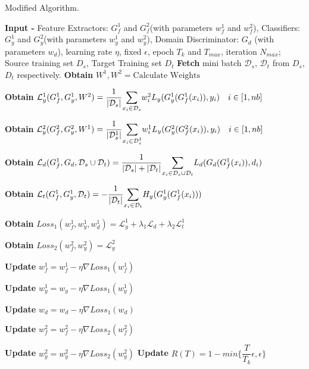 \begin{algorithm}[H]
	\caption{Modified Algorithm.} 
	\begin{algorithmic}[1]
	    \State \textbf{Input -} Feature Extractors: $G_{f}^1$ and $G_{f}^2$(with parameters $w_{f}^1$ and $w_{f}^2$), Classifiers: $G_{y}^1$ and $G_{y}^2$(with parameters $w_{y}^1$ and $w_{y}^2$), Domain Discriminator: $G_d$ (with parameters $w_d$), learning rate $\eta$, fixed $\epsilon$, epoch $T_k$ and $T_{max}$, iteration $N_{max}$;
		    \State Source training set ${D_s}$, Target Training set ${D_t}$
				    \State \textbf{Fetch} mini batch $\mathcal{D}_s$, $\mathcal{D}_t$ from ${D_s}$, ${D_t}$ respectively.
				    \State \textbf{Obtain} $W^1, W^2 = \text{Calculate Weights}$ 
				    
				    \State \textbf{Obtain} $\mathcal{L}_{y}^1(G_{f}^1, G_{y}^1,W^2) =\dfrac{1}{|\mathcal{D}_{s}|} \mathlarger\sum\limits_{x_i \in \mathcal{D}_{s}} w_{i}^2 L_y(G_{y}^1(G_{f}^1(x_i)),y_i) \quad i \in [1, nb]$
				    
                    \State \textbf{Obtain} $\mathcal{L}_{y}^2(G_{f}^2, G_{y}^2, W^1) =\dfrac{1}{|\mathcal{D}_{s}^1|} \mathlarger\sum\limits_{x_i \in \mathcal{D}_{s}^1} w_{i}^1 L_y(G_{y}^2(G_{f}^2(x_i)),y_i) \quad i \in [1, nb]$
				    
				    \State \textbf{Obtain} $\mathcal{L}_d(G_{f}^1, G_{d}, \mathcal{D}_s \cup \mathcal{D}_t) = \dfrac{1}{|\mathcal{D}_s| + |\mathcal{D}_t|} \mathlarger\sum\limits_{x_i \in \mathcal{D}_s \cup \mathcal{D}_t} L_d(G_d(G_{f}^1(x_i)), d_i)$
				    
				    \State \textbf{Obtain} $\mathcal{L}_t(G_{f}^1, G_{y}^1, \mathcal{D}_t) = - \dfrac{1}{|\mathcal{D}_t|} \mathlarger\sum\limits_{x_i \in \mathcal{D}_t} H_y(G_{y}^1(G_{f}^1(x_i)))$ 
				    
				    \State \textbf{Obtain} $Loss_1(w_{f}^1, w_{y}^1, w_{d}^1) = \mathcal{L}_{y}^1 + \lambda_1 \mathcal{L}_{d} + \lambda_2\mathcal{L}_{t}^1$
				    
				    \State \textbf{Obtain} $Loss_2(w_{f}^2, w_{y}^2) = \mathcal{L}_{y}^2$
				    
				    \State \textbf{Update} $w_{f}^1 = w_{f}^1 - \eta\nabla Loss_1(w_{f}^1)$
				    
				    \State \textbf{Update} $w_{y}^1 = w_{y} - \eta\nabla Loss_1(w_{y}^1)$
				    
				    \State \textbf{Update} $w_{d} = w_{d} - \eta\nabla Loss_1(w_{d})$
				    
				    \State \textbf{Update} $w_{f}^2 = w_{f}^2 - \eta\nabla Loss_2(w_{f}^2)$
				    
				    \State \textbf{Update} $w_{y}^2 = w_{y}^2 - \eta\nabla Loss_2(w_{y}^2)$
			    \EndFor
			 \State \textbf{Update} $R(T)= 1- min\bigg\{\dfrac{T}{T_k}\epsilon, \epsilon\bigg\}$
	\EndFor
	\end{algorithmic} 
\label{algo: ctdann}
\end{algorithm}
